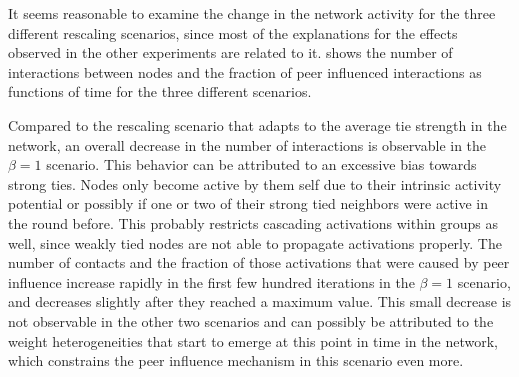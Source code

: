 It seems reasonable to examine the change in the network activity for the three different rescaling scenarios, since most of the explanations for the effects observed in the other experiments are related to it.
 shows the number of interactions between nodes and the fraction of peer influenced interactions as functions of time for the three different scenarios.

Compared to the rescaling scenario that adapts to the average tie strength in the network, an overall decrease in the number of interactions is observable in the \( \beta = 1 \) scenario.
This behavior can be attributed to an excessive bias towards strong ties.
Nodes only become active by them self due to their intrinsic activity potential or possibly if one or two of their strong tied neighbors were active in the round before.
This probably restricts cascading activations within groups as well, since weakly tied nodes are not able to propagate activations properly.
The number of contacts and the fraction of those activations that were caused by peer influence increase rapidly in the first few hundred iterations in the \( \beta = 1 \) scenario, and decreases slightly after they reached a maximum value.
This small decrease is not observable in the other two scenarios and can possibly be attributed to the weight heterogeneities that start to emerge at this point in time in the network, which constrains the peer influence mechanism in this scenario even more.



